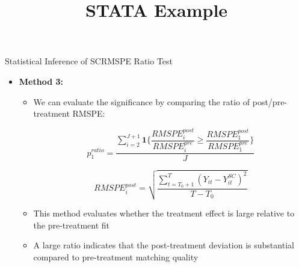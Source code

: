 \documentclass[dvipsnames,hyperref={pdfpagelabels=false}]{beamer}
\begin{document}
\begin{frame}{Statistical Inference of SC}{RMSPE Ratio Test}
	\begin{itemize}
		\item \textbf{Method 3:}
		\vspace{0.2cm}
		\begin{itemize}
			\item We can evaluate the significance by comparing the ratio of post/pre-treatment RMSPE:
			
			\begin{equation*}
				p^{ratio}_{1}=\dfrac{\sum^{J+1}_{i=2}\mathbf{1}\{\dfrac{RMSPE^{post}_{i}}{RMSPE^{pre}_{i}} \geq \dfrac{RMSPE^{post}_{1}}{RMSPE^{pre}_{1}}\}}{J}
\end{equation*}
			
			\begin{equation*}
				RMSPE^{post}_{i}= \sqrt{\dfrac{\sum^{T}_{t=T_{0}+1}(Y_{it} - Y^{SC}_{it})^{2}}{T-T_{0}}}
\end{equation*}
			
			\item This method evaluates whether the treatment effect is large relative to the pre-treatment fit
					\vspace{0.2cm}
			\item A large ratio indicates that the post-treatment deviation is substantial compared to pre-treatment matching quality
		\end{itemize}
	\end{itemize}
\end{frame}

\title[]  
{STATA Example}


\author 
{}

\institute{}






\date
{}


\begin{frame}{}
	\titlepage
\end{frame}
\end{document}
